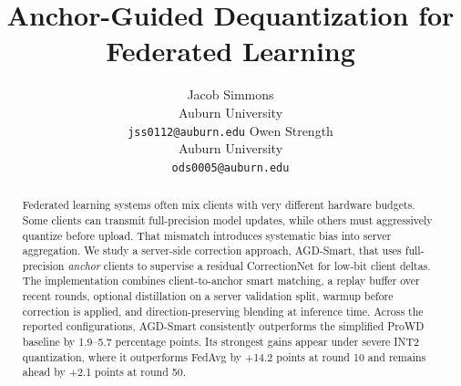 \documentclass{article}
\title{Anchor-Guided Dequantization for Federated Learning}
\author{
  Jacob Simmons\\
  Auburn University\\
  \texttt{jss0112@auburn.edu}
  \And
  Owen Strength\\
  Auburn University\\
  \texttt{ods0005@auburn.edu}
}
\newcommand{\method}{AGD-Smart\xspace}
\begin{document}
\maketitle

\begin{abstract}
Federated learning systems often mix clients with very different hardware
budgets. Some clients can transmit full-precision model updates, while others
must aggressively quantize before upload. That mismatch introduces systematic
bias into server aggregation. We study a server-side correction approach,
\method, that uses full-precision \emph{anchor} clients to supervise a residual
CorrectionNet for low-bit client deltas. The implementation combines
client-to-anchor smart matching, a replay buffer over recent rounds, optional
distillation on a server validation split, warmup before correction is applied,
and direction-preserving blending at inference time. Across the reported
configurations, \method consistently outperforms the simplified ProWD baseline
by 1.9--5.7 percentage points. Its strongest gains appear under severe INT2
quantization, where it outperforms FedAvg by +14.2 points at round 10 and
remains ahead by +2.1 points at round 50.
\end{abstract}










\end{document}
